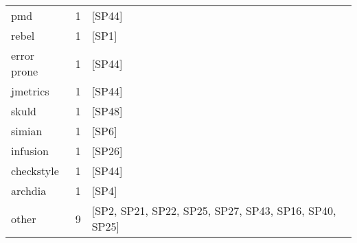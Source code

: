 \begin{tabular}{lrl}
                 pmd &      1 &                                                 [SP44] \\
               rebel &      1 &                                                  [SP1] \\
         error prone &      1 &                                                 [SP44] \\
            jmetrics &      1 &                                                 [SP44] \\
               skuld &      1 &                                                 [SP48] \\
              simian &      1 &                                                  [SP6] \\
            infusion &      1 &                                                 [SP26] \\
          checkstyle &      1 &                                                 [SP44] \\
             archdia &      1 &                                                  [SP4] \\
               other &      9 &  [SP2, SP21, SP22, SP25, SP27, SP43, SP16, SP40, SP25] \\
\bottomrule
\end{tabular}
